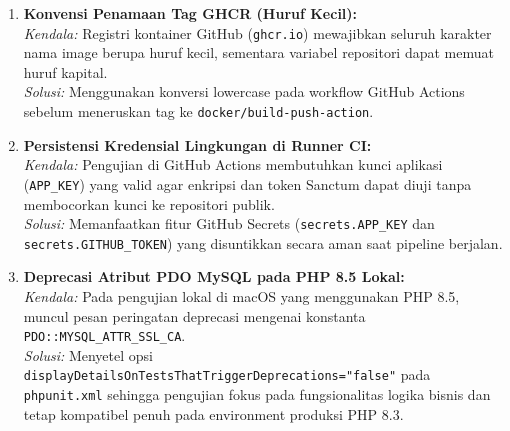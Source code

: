 \documentclass[11pt,a4paper]{article}
\begin{document}
\begin{enumerate}
    \item \textbf{Konvensi Penamaan Tag GHCR (Huruf Kecil):}\\
    \textit{Kendala:} Registri kontainer GitHub (\texttt{ghcr.io}) mewajibkan seluruh karakter nama image berupa huruf kecil, sementara variabel repositori dapat memuat huruf kapital.\\
    \textit{Solusi:} Menggunakan konversi lowercase pada workflow GitHub Actions sebelum meneruskan tag ke \texttt{docker/build-push-action}.

    \item \textbf{Persistensi Kredensial Lingkungan di Runner CI:}\\
    \textit{Kendala:} Pengujian di GitHub Actions membutuhkan kunci aplikasi (\texttt{APP\_KEY}) yang valid agar enkripsi dan token Sanctum dapat diuji tanpa membocorkan kunci ke repositori publik.\\
    \textit{Solusi:} Memanfaatkan fitur GitHub Secrets (\texttt{secrets.APP\_KEY} dan \texttt{secrets.GITHUB\_TOKEN}) yang disuntikkan secara aman saat pipeline berjalan.

    \item \textbf{Deprecasi Atribut PDO MySQL pada PHP 8.5 Lokal:}\\
    \textit{Kendala:} Pada pengujian lokal di macOS yang menggunakan PHP 8.5, muncul pesan peringatan deprecasi mengenai konstanta \texttt{PDO::MYSQL\_ATTR\_SSL\_CA}.\\
    \textit{Solusi:} Menyetel opsi \texttt{displayDetailsOnTestsThatTriggerDeprecations="false"} pada \texttt{phpunit.xml} sehingga pengujian fokus pada fungsionalitas logika bisnis dan tetap kompatibel penuh pada environment produksi PHP 8.3.
\end{enumerate}

\end{document}
